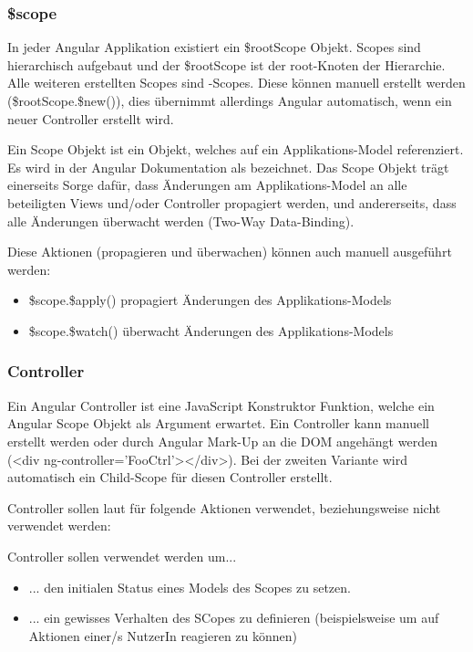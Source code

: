 \subsubsection{\$scope}
In jeder Angular Applikation existiert ein \$rootScope Objekt. Scopes sind hierarchisch aufgebaut und der \$rootScope ist der root-Knoten der Hierarchie. Alle weiteren erstellten Scopes sind -Scopes. Diese können manuell erstellt werden (\$rootScope.\$new()), dies übernimmt allerdings Angular automatisch, wenn ein neuer Controller erstellt wird.

Ein Scope Objekt ist ein Objekt, welches auf ein Applikations-Model referenziert. Es wird in der Angular Dokumentation als  \autocite{Angular:Scope} bezeichnet. Das Scope Objekt trägt einerseits Sorge dafür, dass Änderungen am Applikations-Model an alle beteiligten Views und/oder Controller propagiert werden, und andererseits, dass alle Änderungen überwacht werden (Two-Way Data-Binding).

Diese Aktionen (propagieren und überwachen) können auch manuell ausgeführt werden:
\begin{itemize}
  \item \$scope.\$apply() propagiert Änderungen des Applikations-Models
  \item \$scope.\$watch() überwacht Änderungen des Applikations-Models
\end{itemize}

\subsubsection{Controller}
Ein Angular Controller ist eine JavaScript Konstruktor Funktion, welche ein Angular Scope Objekt als Argument erwartet. Ein Controller kann manuell erstellt werden oder durch Angular Mark-Up an die DOM angehängt werden (<div ng-controller='FooCtrl'></div>). Bei der zweiten Variante wird automatisch ein Child-Scope für diesen Controller erstellt.

Controller sollen laut \cite{Angular:Controller} für folgende Aktionen verwendet, beziehungsweise nicht verwendet werden:

Controller sollen verwendet werden um...
\begin{itemize}
  \item ... den initialen Status eines Models des Scopes zu setzen.
  \item ... ein gewisses Verhalten des SCopes zu definieren (beispielsweise um auf Aktionen einer/s NutzerIn reagieren zu können)
\end{itemize}

